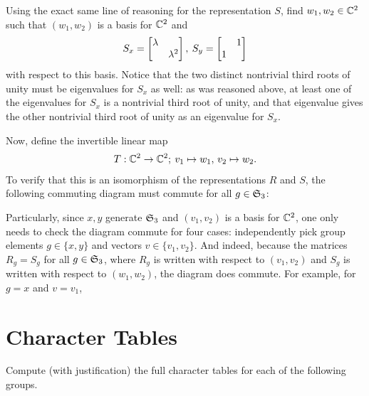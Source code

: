 \documentclass[12pt]{article}
\begin{document}
Using the exact same line of reasoning for the representation $S$, find $w_1, w_2 \in \mathbb{C}^2$ such that $(w_1, w_2)$ is a basis for $\mathbb{C}^2$ and 
$$S_x = \begin{bmatrix}\lambda \\ & \lambda^2\end{bmatrix}, \: S_y = \begin{bmatrix} & 1 \\ 1\end{bmatrix}$$
with respect to this basis. 
Notice that the two distinct nontrivial third roots of unity must be eigenvalues for $S_x$ as well: 
as was reasoned above, at least one of the eigenvalues for $S_x$ is a nontrivial third root of unity, and that eigenvalue gives the other nontrivial third root of unity as an eigenvalue for $S_x$. 

Now, define the invertible linear map 
$$T: \mathbb{C}^2 \rightarrow \mathbb{C}^2; \: v_1 \mapsto w_1, \, v_2 \mapsto w_2.$$
To verify that this is an isomorphism of the representations $R$ and $S$, the following commuting diagram must commute for all $g \in \mathfrak{S}_3$: 
\begin{center}
\end{center}
Particularly, since $x, y$ generate $\mathfrak{S}_3$ and $(v_1, v_2)$ is a basis for $\mathbb{C}^2$, one only needs to check the diagram commute for four cases: 
independently pick group elements $g \in \{x, y\}$ and vectors $v \in \{v_1, v_2\}$. 
And indeed, because the matrices $R_g = S_g$ for all $g \in \mathfrak{S}_3$, where $R_g$ is written with respect to $(v_1, v_2)$ and $S_g$ is written with respect to $(w_1, w_2)$, the diagram does commute. 
For example, for $g = x$ and $v = v_1$, 
\begin{center}
\end{center}


\section{Character Tables}

Compute (with justification) the full character tables for each of the
following groups.
\end{document}
